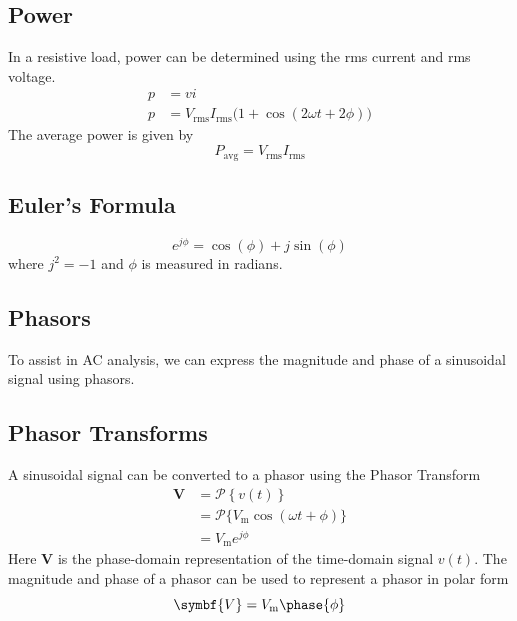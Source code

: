\documentclass{article}
\begin{document}
\subsection{Power}
\begin{definition}
    In a resistive load, power can be determined using the rms current and rms voltage.
    \begin{align*}
        p & = vi                                                                                           \\
        p & = V_{\mathrm{rms}} I_{\mathrm{rms}} \bigl( 1 + \cos{\left( 2 \omega t + 2 \phi \right)} \bigr)
    \end{align*}
    The average power is given by
    \begin{equation*}
        P_{\mathrm{avg}} = V_{\mathrm{rms}}I_{\mathrm{rms}}
    \end{equation*}
\end{definition}
\subsection{Euler's Formula}
\begin{theorem}
    \label{theorem:eulers_formula}
    \begin{equation*}
        e^{j\phi} = \cos{\left( \phi \right)} + j \sin{\left( \phi \right)}
    \end{equation*}
    where \(j^2 = -1\) and \(\phi\) is measured in radians.
\end{theorem}
\subsection{Phasors}
\begin{definition}
    To assist in AC analysis, we can express the magnitude and phase of a sinusoidal signal
    using phasors.
\end{definition}
\subsection{Phasor Transforms}
\begin{definition}
    A sinusoidal signal can be converted to a phasor using the Phasor Transform
    \begin{align*}
        \symbf{V} & = \mathscr{P}\left\{ v(t) \right\}                                              \\
                  & = \mathscr{P}\bigl\{ V_{\mathrm{m}}\cos{\left( \omega t + \phi \right)} \bigr\} \\
                  & = V_{\mathrm{m}} e^{j\phi}
    \end{align*}
    Here \(\symbf{V}\) is the phase-domain representation of the
    time-domain signal \(v(t)\). The magnitude and phase of a phasor can
    be used to represent a phasor in polar form
    \begin{equation*}
        \symbf{V} = V_{\mathrm{m}} \phase{\phi}
    \end{equation*}
\end{definition}
\end{document}
